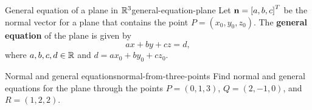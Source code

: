 \begin{definition}{General equation of a plane in $\mathbb{R}^3$}{general-equation-plane}
  Let $\mbox{\bf n} = \left[a,b,c\right]^T$ be the normal vector for a plane that
  contains the point $P = (x_0, y_0, z_0)$. The \textbf{general
    equation}%
   of the plane is given by
  \begin{equation*}
    ax + by + cz = d,
  \end{equation*}
  where $a,b,c,d \in \mathbb{R}$ and $d = ax_0 + by_0 + cz_0$.
\end{definition}

\begin{example}{Normal and general equations}{normal-from-three-points}
  Find normal and general equations for the plane through the points
  $P = (0,1,3)$, $Q=(2,-1,0)$, and $R=(1,2,2)$.
\end{example}

